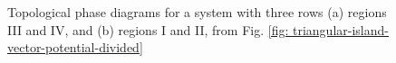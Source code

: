 \documentclass[aps,prb,showpacs,amsmath,amssymb,superscriptaddress]{revtex4-2}
\begin{document}
\begin{figure}[]
  \hfill
  \hfill
  \caption{Topological phase diagrams for a system with three rows (a) regions III and IV, and (b) regions I and II, from Fig. \ref{fig: triangular-island-vector-potential-divided}}
  \label{fig: majorana-number}
\end{figure}
\end{document}
